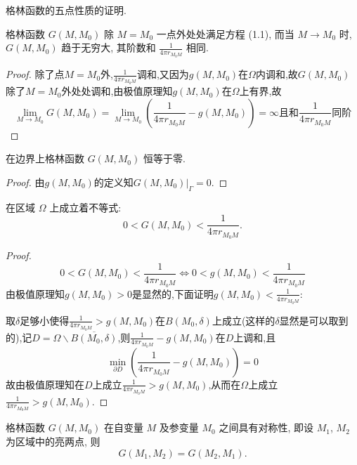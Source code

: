 \begin{note}
  格林函数的五点性质的证明.

  \begin{property}
    格林函数 $G(M, M_0)$ 除 $M=M_0$ 一点外处处满足方程 (1.1), 而当 $M\to M_0$ 时,
    $G(M, M_0)$ 趋于无穷大, 其阶数和 $\frac{1}{4\pi r_{M_0M}}$ 相同.
  \end{property}

  \begin{proof}
    除了点$M=M_0$外,$\frac{1}{4\pi r_{M_0M}}$调和,又因为$g(M,M_0)$在$\varOmega$内调和,故$G(M,M_0)$除了$M=M_0$外处处调和,由极值原理知$g(M,M_0)$在$\varOmega$上有界,故
    \[\lim_{M\to M_0}G(M,M_0)=\lim_{M\to M_0}\left(\frac{1}{4\pi r_{M_0M}}-g(M,M_0)\right)=\infty\mbox{且和}\frac{1}{4\pi r_{M_0M}}\mbox{同阶}\]
  \end{proof}

  \begin{property}
    在边界上格林函数 $G(M, M_0)$ 恒等于零.
  \end{property}

  \begin{proof}
    由$g(M,M_0)$的定义知$G(M,M_0)|_{\Gamma}=0$.
  \end{proof}

  \begin{property}
    在区域 $\varOmega$ 上成立着不等式:
    \[0 < G(M, M_0) < \frac{1}{4\pi r_{M_0M}}.\]
  \end{property}
  
  \begin{proof}
    \[0<G(M,M_0)<\frac{1}{4\pi r_{M_0M}}\Leftrightarrow 0<g(M,M_0)<\frac{1}{4\pi r_{M_0M}}\]
    由极值原理知$g(M,M_0)>0$是显然的,下面证明$g(M,M_0)<\frac{1}{4\pi r_{M_0M}}$:

    取$\delta$足够小使得$\frac{1}{4\pi r_{M_0M}}>g(M,M_0)$在$B(M_0,\delta)$上成立(这样的$\delta$显然是可以取到的),记$D=\varOmega\backslash\overline{B(M_0,\delta)}$,则$\frac{1}{4\pi r_{M_0M}}-g(M,M_0)$在$D$上调和,且
    \[\min_{\partial D}\left(\frac{1}{4\pi r_{M_0M}}-g(M,M_0)\right)=0\]
    故由极值原理知在$D$上成立$\frac{1}{4\pi r_{M_0M}}>g(M,M_0)$,从而在$\varOmega$上成立$\frac{1}{4\pi r_{M_0M}}>g(M,M_0)$.
  \end{proof}

  \begin{property}
    格林函数 $G(M, M_0)$ 在自变量 $M$ 及参变量 $M_0$ 之间具有对称性, 即设
    $M_1$, $M_2$ 为区域中的亮两点, 则
    \[G(M_1, M_2) = G(M_2, M_1).\]
  \end{property}
  

\end{note}
